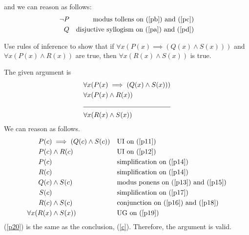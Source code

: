 \documentclass[a4paper]{exam}
\begin{document}
\begin{questions}
\begin{solution}
    and we can reason as follows:
    \begin{align}
      \neg P && \text{modus tollens on (\ref{pb}) and (\ref{pc})} \label{pd}\\
      Q && \text{disjuctive syllogism on (\ref{pa}) and (\ref{pd})} \label{pe}
    \end{align}
  \end{solution}
  
  \question Use rules of inference to show that if $\forall x(P(x) \implies (Q(x) \land S(x)))$ and $\forall x(P(x) \land R(x))$ are true, then $\forall x(R(x) \land S(x))$ is true.
  \begin{solution}
    The given argument is
    \begin{align}
      \setcounter{equation}{0}
      \forall x(P(x) &\implies (Q(x) \land S(x))) \label{p11}\\
      \forall x(P(x) &\land R(x)) \label{p12}\\
      \cline{1-2}
      \forall x(R(x) &\land S(x)) \label{c}
    \end{align}
    We can reason as follows.
    \begin{align}
      P(c) & \implies (Q(c)\land S(c)) && \text{UI on (\ref{p11})} \label{p13}\\
      P(c) & \land R(c) && \text{UI on (\ref{p12})} \label{p14}\\
      P(c) &  && \text{simplification on (\ref{p14})} \label{p15}\\
      R(c) &  && \text{simplification on (\ref{p14})} \label{p16}\\
      Q(c) & \land S(c) && \text{modus ponens on (\ref{p13}) and  (\ref{p15})} \label{p17}\\
      S(c) &  && \text{simplification on (\ref{p17})} \label{p18}\\
      R(c) & \land S(c) && \text{conjunction on (\ref{p16}) and  (\ref{p18})} \label{p19}\\
      \forall x(R(x) &\land S(x))  && \text{UG on (\ref{p19})} \label{p20}
    \end{align}
    (\ref{p20}) is the same as the conclusion, (\ref{c}). Therefore, the argument is valid.
  \end{solution}

\end{questions}
\end{document}
